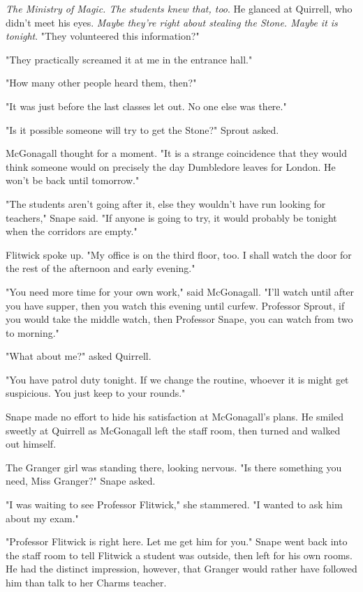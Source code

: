 \documentclass[a4paper,11pt]{article}
\begin{document}
\emph{The Ministry of Magic. The students knew that, too}. He glanced at Quirrell, who didn't meet his eyes. \emph{Maybe they're right about stealing the Stone. Maybe it is tonight}. "They volunteered this information?"

"They practically screamed it at me in the entrance hall."

"How many other people heard them, then?"

"It was just before the last classes let out. No one else was there."

"Is it possible someone will try to get the Stone?" Sprout asked.

McGonagall thought for a moment. "It is a strange coincidence that they would think someone would on precisely the day Dumbledore leaves for London. He won't be back until tomorrow."

"The students aren't going after it, else they wouldn't have run looking for teachers," Snape said. "If anyone is going to try, it would probably be tonight when the corridors are empty."

Flitwick spoke up. "My office is on the third floor, too. I shall watch the door for the rest of the afternoon and early evening."

"You need more time for your own work," said McGonagall. "I'll watch until after you have supper, then you watch this evening until curfew. Professor Sprout, if you would take the middle watch, then Professor Snape, you can watch from two to morning."

"What about me?" asked Quirrell.

"You have patrol duty tonight. If we change the routine, whoever it is might get suspicious. You just keep to your rounds."

Snape made no effort to hide his satisfaction at McGonagall's plans. He smiled sweetly at Quirrell as McGonagall left the staff room, then turned and walked out himself.

The Granger girl was standing there, looking nervous. "Is there something you need, Miss Granger?" Snape asked.

"I was waiting to see Professor Flitwick," she stammered. "I wanted to ask him about my exam."

"Professor Flitwick is right here. Let me get him for you." Snape went back into the staff room to tell Flitwick a student was outside, then left for his own rooms. He had the distinct impression, however, that Granger would rather have followed him than talk to her Charms teacher.
\end{document}
